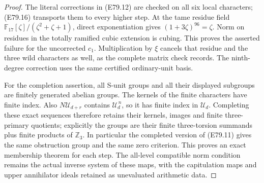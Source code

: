\begin{proof}
The literal corrections in (E79.12) are checked on
all six local characters; (E79.16) transports them
to every higher step. At the tame residue field
$\mathbb F_{17}[\zeta]/(\zeta^2+\zeta+1)$, direct
exponentiation gives $(1+3\zeta)^{96}=\zeta$.
Norm on residues in the totally ramified cubic
extension is cubing. This proves the asserted
failure for the uncorrected $c_1$. Multiplication
by $\xi$ cancels that residue and the three wild
characters as well, as the complete matrix check
records. The ninth-degree correction uses the same
certified ordinary-unit basis.

For the completion assertion, all S-unit groups and
all their displayed subgroups are finitely generated
abelian groups. The kernels of the finite characters
have finite index. Also $N\mathscr U_{d+r}$ contains
$\mathscr U_d^{\,n}$, so it has finite index in
$\mathscr U_d$. Completing these exact sequences
therefore retains their kernels, images and finite
three-primary quotients; explicitly the groups are
their finite three-torsion summands plus finite
products of $\mathbb Z_3$. In particular the
completed version of (E79.11) gives the same
obstruction group and the same zero criterion.
This proves an exact membership theorem for each
step. The all-level compatible norm condition
remains the actual inverse system of these maps,
with the capitulation maps and upper annihilator
ideals retained as unevaluated arithmetic data.
\end{proof}

